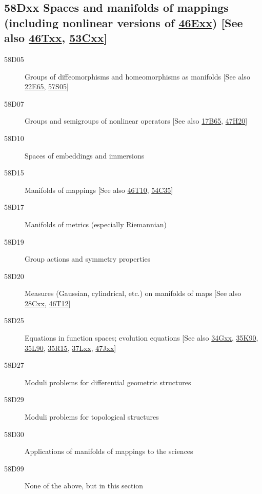 \subsection*{58Dxx  Spaces and manifolds of mappings (including nonlinear versions of \hyperref[46Exx]{46Exx}) [See also \hyperref[46Txx]{46Txx}, \hyperref[53Cxx]{53Cxx}] }\label{58Dxx}
\begin{description}  
\item [58D05]\label{58D05} Groups of diffeomorphisms and homeomorphisms as manifolds [See also \hyperref[22E65]{22E65}, \hyperref[57S05]{57S05}]
\item [58D07]\label{58D07} Groups and semigroups of nonlinear operators [See also \hyperref[17B65]{17B65}, \hyperref[47H20]{47H20}]
\item [58D10]\label{58D10} Spaces of embeddings and immersions
\item [58D15]\label{58D15} Manifolds of mappings [See also \hyperref[46T10]{46T10}, \hyperref[54C35]{54C35}]
\item [58D17]\label{58D17} Manifolds of metrics (especially Riemannian)
\item [58D19]\label{58D19} Group actions and symmetry properties
\item [58D20]\label{58D20} Measures (Gaussian, cylindrical, etc.) on manifolds of maps [See also \hyperref[28Cxx]{28Cxx}, \hyperref[46T12]{46T12}]
\item [58D25]\label{58D25} Equations in function spaces; evolution equations [See also \hyperref[34Gxx]{34Gxx}, \hyperref[35K90]{35K90}, \hyperref[35L90]{35L90}, \hyperref[35R15]{35R15}, \hyperref[37Lxx]{37Lxx}, \hyperref[47Jxx]{47Jxx}]
\item [58D27]\label{58D27} Moduli problems for differential geometric structures
\item [58D29]\label{58D29} Moduli problems for topological structures
\item [58D30]\label{58D30} Applications of manifolds of mappings to the sciences
\item [58D99]\label{58D99} None of the above, but in this section
\end{description}
